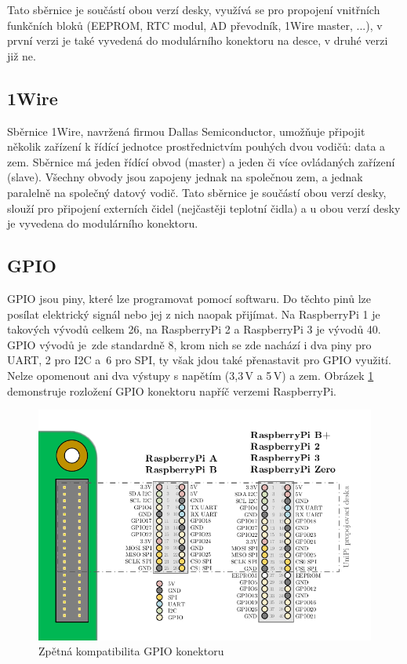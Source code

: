 Tato sběrnice je součástí obou verzí desky, využívá se pro propojení vnitřních funkčních bloků (EEPROM, RTC modul, AD převodník, 1Wire master, ...), v první verzi je také vyvedená do modulárního konektoru na desce, v druhé verzi již ne.

\subsection{1Wire}
Sběrnice 1Wire, navržená firmou Dallas Semiconductor, umožňuje připojit několik zařízení k řídící jednotce prostřednictvím pouhých dvou vodičů: data a zem. Sběrnice má jeden řídící obvod (master) a jeden či více ovládaných zařízení (slave). Všechny obvody jsou zapojeny jednak na společnou zem, a jednak paralelně na společný datový vodič. Tato sběrnice je součástí obou verzí desky, slouží pro připojení externích čidel (nejčastěji teplotní čidla) a u obou verzí desky je vyvedena do modulárního konektoru.

\subsection{GPIO}
\label{KapGPIO}
GPIO jsou piny, které lze programovat pomocí softwaru. Do těchto pinů lze posílat elektrický signál nebo jej z nich naopak přijímat. Na RaspberryPi 1 je takových vývodů celkem 26, na RaspberryPi 2 a RaspberryPi 3 je vývodů 40. GPIO vývodů je~zde standardně 8, krom nich se zde nachází i dva piny pro UART, 2 pro I2C a~6 pro SPI, ty však jdou také přenastavit pro GPIO využití. Nelze opomenout ani dva výstupy s napětím (3,3\,V a 5\,V) a zem.
Obrázek \ref{ObrazekGPIO} demonstruje rozložení GPIO konektoru napříč verzemi RaspberryPi.

\begin{figure}[!ht]
\vspace{-20pt}
  \begin{center}
    \includegraphics[scale=1.0]{obrazky/unipi_gpio}
  \end{center}
	\vspace{-20pt}
  \caption{Zpětná kompatibilita GPIO konektoru}
	\label{ObrazekGPIO}
	\vspace{-10pt}
\end{figure}

